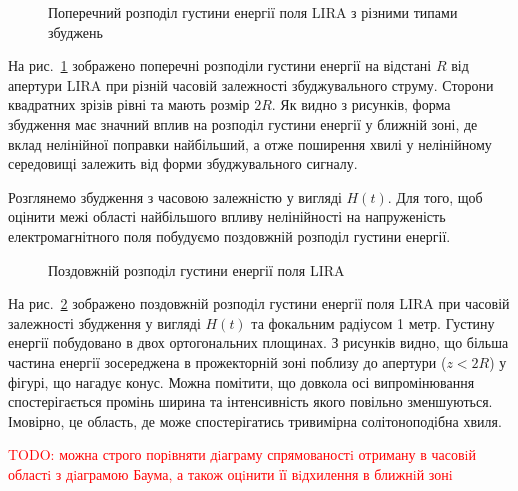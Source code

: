 \begin{figure}
\caption{Поперечний розподіл густини енергії поля LIRA з різними типами збуджень}
\label{fig:trans_dist}
\end{figure}

На рис.~\ref{fig:trans_dist} зображено поперечні розподіли густини енергії на 
відстані $ R $ від апертури LIRA при різній часовій залежності збуджувального 
струму. Сторони квадратних зрізів рівні та мають розмір $ 2R $. Як видно з 
рисунків, форма збудження має значний вплив на розподіл густини енергії у 
ближній зоні, де вклад нелінійної поправки найбільший, а отже поширення хвилі 
у нелінійному середовищі залежить від форми збуджувального сигналу.


Розглянемо збудження з часовою залежністю у вигляді $ H(t) $. Для того, щоб 
оцінити межі області найбільшого впливу нелінійності на напруженість 
електромагнітного поля побудуємо поздовжній розподіл густини енергії. 

\begin{figure}
\caption{Поздовжній розподіл густини енергії поля LIRA}
\label{fig:long_dist}
\end{figure}

На рис.~\ref{fig:long_dist} зображено поздовжній розподіл густини енергії 
поля LIRA при часовій залежності збудження у вигляді $ H(t) $ та фокальним 
радіусом 1 метр. Густину енергії побудовано в двох ортогональних площинах.
З рисунків видно, що більша частина енергії зосереджена в прожекторній зоні 
поблизу до апертури ($ z < 2R $) у фігурі, що нагадує конус. Можна помітити, 
що довкола осі випромінювання спостерігається промінь ширина та інтенсивність 
якого повільно зменшуються. Імовірно, це область, де може спостерігатись 
тривимірна солітоноподібна хвиля.

\textcolor{red}{TODO: можна строго порiвняти дiаграму спрямованостi отриману в
часовiй областi з дiаграмою Баума, а також оцiнити її вiдхилення в ближнiй
зонi}

